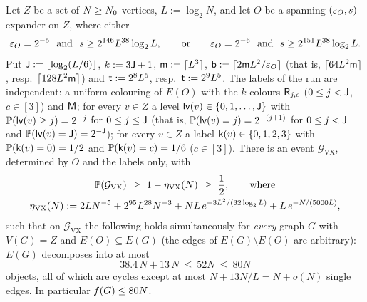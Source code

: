 \begin{theorem}\label{s4:thmVXp}
Let $Z$ be a set of $N\ge N_{0}$ vertices, $L:=\log_2N$, and let $O$ be a spanning $(\varepsilon_O,s)$-expander on $Z$, where
either
\[
\eps_O=2^{-5}\ \text{ and }\ s\ge2^{146}L^{38}\log_2L,\qquad\text{or}\qquad \eps_O=2^{-6}\ \text{ and }\
s\ge2^{151}L^{38}\log_2L .
\]
Put $\mathsf{J}:=\lfloor\log_2(L/6)\rfloor$, $k:=3\mathsf{J}+1$, $\mathsf{m}:=\lceil L^3\rceil$, $\mathsf{b}:=\lceil2\mathsf{m} L^2/\varepsilon_O\rceil$ (that
is, $\lceil64L^2\mathsf{m}\rceil$, resp.\ $\lceil128L^2\mathsf{m}\rceil$) and $\mathsf{t}:=2^8L^5$, resp.\ $\mathsf{t}:=2^9L^5$. The labels of the
run are independent: a uniform colouring of $E(O)$ with the $k$ colours $\mathsf{R}_{j,c}$ ($0\le j<\mathsf{J}$, $c\in[3]$) and
$\mathsf{M}$; for every $v\in Z$ a level $\mathsf{lv}(v)\in\{0,1,\dots,\mathsf{J}\}$ with $\mathbb{P}(\mathsf{lv}(v)\ge j)=2^{-j}$ for $0\le j\le\mathsf{J}$ (that is,
$\mathbb{P}(\mathsf{lv}(v)=j)=2^{-(j+1)}$ for $0\le j<\mathsf{J}$ and $\mathbb{P}(\mathsf{lv}(v)=\mathsf{J})=2^{-\mathsf{J}}$); for every $v\in Z$ a
label $\mathsf{k}(v)\in\{0,1,2,3\}$ with $\mathbb{P}(\mathsf{k}(v)=0)=1/2$ and $\mathbb{P}(\mathsf{k}(v)=c)=1/6$ ($c\in[3]$). There is an
event $\mathcal G_{\mathrm{VX}}$, determined by $O$ and the labels only, with
\begin{equation}\label{s4:eqVXprob}
\begin{gathered}
\Prob(\mathcal G_{\mathrm{VX}})\ \ge\ 1-\eta_{\mathrm{VX}}(N)\ \ge\ \frac12,\qquad\text{where}\\
\eta_{\mathrm{VX}}(N):=2LN^{-5}+2^{95}L^{28}N^{-3}+NL\,e^{-3L^2/(32\log_2L)}+L\,e^{-N/(5000L)},
\end{gathered}
\end{equation}
such that on $\mathcal G_{\mathrm{VX}}$ the following holds simultaneously for \emph{every} graph $G$ with $V(G)=Z$ and
$E(O)\subseteq E(G)$ (the edges of $E(G)\setminus E(O)$ are arbitrary): $E(G)$ decomposes into at most
\[
38.4\,N+13\,N\ \le\ 52N\ \le\ 80N
\]
objects, all of which are cycles except at most $N+13N/L=N+o(N)$ single edges. In particular
$f(G)\le80N$.
\end{theorem}


